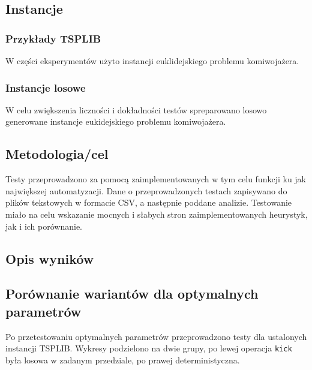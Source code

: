 \documentclass{article}
\begin{document}
\subsection{Instancje}
\subsubsection{Przykłady TSPLIB}
W części eksperymentów użyto instancji euklidejskiego problemu komiwojażera.

\subsubsection{Instancje losowe}
W celu zwiększenia liczności i dokładności testów spreparowano losowo generowane instancje eukidejskiego problemu komiwojażera.

\subsection{Metodologia/cel}

Testy przeprowadzono za pomocą zaimplementowanych w tym celu funkcji ku jak największej automatyzacji. Dane o przeprowadzonych testach zapisywano do plików tekstowych w formacie CSV, a następnie poddane analizie. Testowanie miało na celu wskazanie mocnych i słabych stron zaimplementowanych heurystyk, jak i ich porównanie.

\subsection{Opis wyników}

\subsection{Porównanie wariantów dla optymalnych parametrów}

Po przetestowaniu optymalnych parametrów przeprowadzono testy dla ustalonych instancji TSPLIB. Wykresy podzielono na dwie grupy, po lewej operacja \texttt{kick} była losowa w zadanym przedziale, po prawej deterministyczna.
\\
\end{document}
